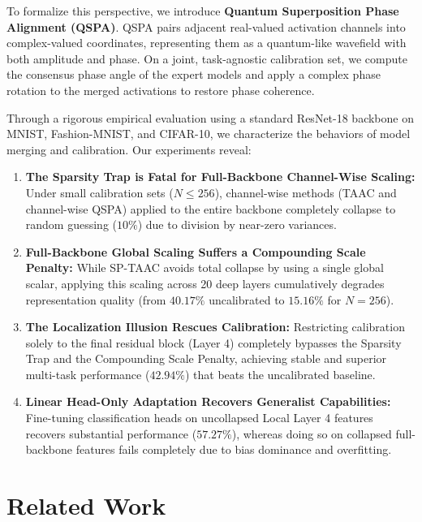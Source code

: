\documentclass{article}
\begin{document}
To formalize this perspective, we introduce \textbf{Quantum Superposition Phase Alignment (QSPA)}. QSPA pairs adjacent real-valued activation channels into complex-valued coordinates, representing them as a quantum-like wavefield with both amplitude and phase. On a joint, task-agnostic calibration set, we compute the consensus phase angle of the expert models and apply a complex phase rotation to the merged activations to restore phase coherence. 

Through a rigorous empirical evaluation using a standard ResNet-18 backbone on MNIST, Fashion-MNIST, and CIFAR-10, we characterize the behaviors of model merging and calibration. Our experiments reveal:
\begin{enumerate}
    \item \textbf{The Sparsity Trap is Fatal for Full-Backbone Channel-Wise Scaling:} Under small calibration sets ($N \le 256$), channel-wise methods (TAAC and channel-wise QSPA) applied to the entire backbone completely collapse to random guessing ($10\%$) due to division by near-zero variances.
    \item \textbf{Full-Backbone Global Scaling Suffers a Compounding Scale Penalty:} While SP-TAAC \cite{sp_taac2026} avoids total collapse by using a single global scalar, applying this scaling across 20 deep layers cumulatively degrades representation quality (from $40.17\%$ uncalibrated to $15.16\%$ for $N=256$).
    \item \textbf{The Localization Illusion Rescues Calibration:} Restricting calibration solely to the final residual block (Layer 4) completely bypasses the Sparsity Trap and the Compounding Scale Penalty, achieving stable and superior multi-task performance ($42.94\%$) that beats the uncalibrated baseline.
    \item \textbf{Linear Head-Only Adaptation Recovers Generalist Capabilities:} Fine-tuning classification heads on uncollapsed Local Layer 4 features recovers substantial performance ($57.27\%$), whereas doing so on collapsed full-backbone features fails completely due to bias dominance and overfitting.
\end{enumerate}

\section{Related Work}
\label{submission:related}
\end{document}
